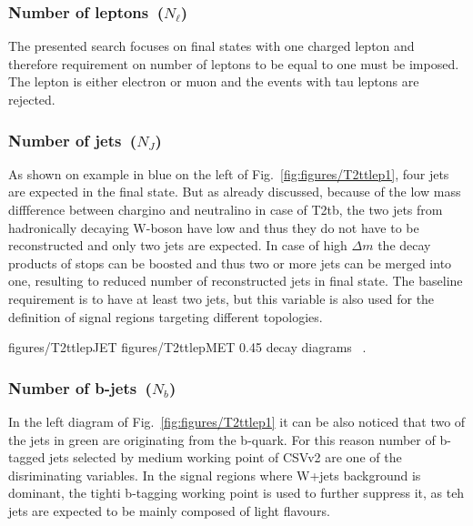 \subsubsection{Number of leptons~($N_{\ell}$)}

The presented search focuses on final states with one charged lepton and therefore requirement on number of leptons to be equal to one must be imposed. The lepton is either electron or muon and the events with tau leptons are rejected.

\subsubsection{Number of jets~($N_{J}$)}

As shown on example in blue on the left of Fig.~\ref{fig:figures/T2ttlep1}, four jets are expected in the final state. But as already discussed, because of the low mass diffference between chargino and neutralino in case of T2tb, the two jets from hadronically decaying W-boson have low \pt and thus they do not have to be reconstructed and only two jets are expected. In case of high $\Delta m$ the decay products of stops can be boosted and thus two or more jets can be merged into one, resulting to reduced number of reconstructed jets in final state. The baseline requirement is to have at least two jets, but this variable is also used for the definition of signal regions targeting different topologies.


                 {figures/T2ttlepJET} %
                 {figures/T2ttlepMET} %
                 {0.45}       %
                 { decay diagrams ~\cite{CMS:2016vew}. }

\subsubsection{Number of b-jets~($N_{b}$)}

In the left diagram of Fig.~\ref{fig:figures/T2ttlep1} it can be also noticed that two of the jets in green are originating from the b-quark. For this reason number of b-tagged jets selected by medium working point of CSVv2 are one of the disriminating variables. In the signal regions where W+jets background is dominant, the tighti b-tagging working point is used to further suppress it, as teh jets are expected to be mainly composed of light flavours.

